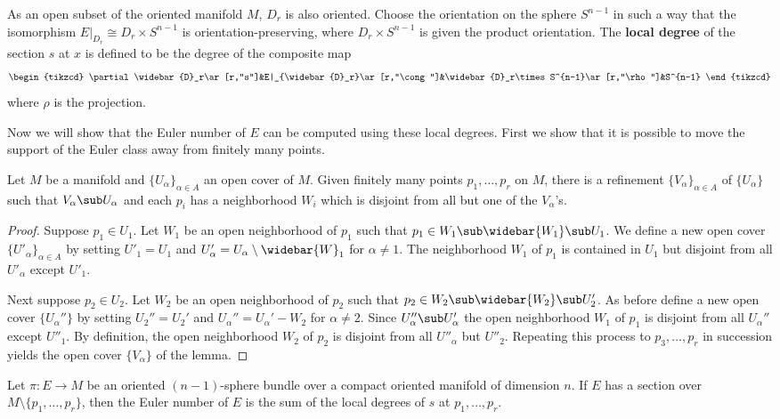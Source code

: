As an open subset of the oriented manifold $M$, $D_r$ is also oriented. Choose the orientation on the sphere $S^{n-1}$ in such a way that the isomorphism 
$E|_{D_r}\cong D_r\times S^{n-1}$ is orientation-preserving, where $D_r\times S^{n-1}$ is given the product orientation. The \textbf{local degree} of the section $s$ 
at $x$ is defined to be the degree of the composite map
\[\begin{tikzcd}
\partial\widebar{D}_r\ar[r,"s"]&E|_{\widebar{D}_r}\ar[r,"\cong"]&\widebar{D}_r\times S^{n-1}\ar[r,"\rho"]&S^{n-1}
\end{tikzcd}\]
where $\rho$ is the projection.\par
Now we will show that the Euler number of $E$ can be computed using these local degrees. First we show that it is possible to move the support of the Euler class 
away from finitely many points.
\begin{lemma}
Let $M$ be a manifold and $\{U_\alpha\}_{\alpha\in A}$ an open cover of $M$. Given finitely many points $p_1,\dots,p_r$ on $M$, there is a refinement $\{V_\alpha\}_{\alpha\in A}$ 
of $\{U_\alpha\}$ such that $V_\alpha\sub U_\alpha$ and each $p_i$ has a neighborhood $W_i$ which is disjoint from all but one of the $V_\alpha$'s.
\end{lemma}
\begin{proof}
Suppose $p_1\in U_1$. Let $W_1$ be an open neighborhood of $p_1$ such that $p_1\in W_1\sub\widebar{W_1}\sub U_1$. We define a new open cover $\{U'_\alpha\}_{\alpha\in A}$ 
by setting $U'_1=U_1$ and $U'_\alpha=U_\alpha\setminus\widebar{W}_1$ for $\alpha\neq 1$. The neighborhood $W_1$ of $p_1$ is contained in $U_1$ but disjoint from all $U'_\alpha$ 
except $U'_1$.\par
Next suppose $p_2\in U_2$. Let $W_2$ be an open neighborhood of $p_2$ such that $p_2\in W_2\sub\widebar{W_2}\sub U'_2$. As before define a new open cover $\{U_\alpha''\}$ 
by setting $U_2''=U_2'$ and $U_\alpha''=U_\alpha'-W_2$ for $\alpha\neq 2$. Since $U''_\alpha\sub U'_\alpha$ the open neighborhood $W_1$ of $p_1$ is disjoint from all $U_\alpha''$ 
except $U''_1$. By definition, the open neighborhood $W_2$ of $p_2$ is disjoint from all $U''_\alpha$ but $U''_2$. Repeating this process to $p_3,\dots,p_r$ in succession 
yields the open cover $\{V_\alpha\}$ of the lemma.
\end{proof}
\begin{theorem}\label{sphere bundle Euler number local degree}
Let $\pi:E\to M$ be an oriented $(n-1)$-sphere bundle over a compact oriented manifold of dimension $n$. If $E$ has a section over $M\setminus\{p_1,\dots,p_r\}$, then 
the Euler number of $E$ is the sum of the local degrees of $s$ at $p_1,\dots,p_r$.
\end{theorem}
